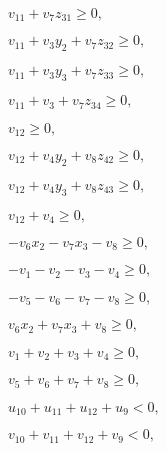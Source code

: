 \documentclass{article}
\begin{document}
$v_{11} + v_{7} z_{31} \geq 0,$

$v_{11} + v_{3} y_{2} + v_{7} z_{32} \geq 0,$

$v_{11} + v_{3} y_{3} + v_{7} z_{33} \geq 0,$

$v_{11} + v_{3} + v_{7} z_{34} \geq 0,$

$v_{12} \geq 0,$

$v_{12} + v_{4} y_{2} + v_{8} z_{42} \geq 0,$

$v_{12} + v_{4} y_{3} + v_{8} z_{43} \geq 0,$

$v_{12} + v_{4} \geq 0,$

$- v_{6} x_{2} - v_{7} x_{3} - v_{8} \geq 0,$

$- v_{1} - v_{2} - v_{3} - v_{4} \geq 0,$

$- v_{5} - v_{6} - v_{7} - v_{8} \geq 0,$

$v_{6} x_{2} + v_{7} x_{3} + v_{8} \geq 0,$

$v_{1} + v_{2} + v_{3} + v_{4} \geq 0,$

$v_{5} + v_{6} + v_{7} + v_{8} \geq 0,$

$u_{10} + u_{11} + u_{12} + u_{9} < 0,$

$v_{10} + v_{11} + v_{12} + v_{9} < 0,$
\end{document}
